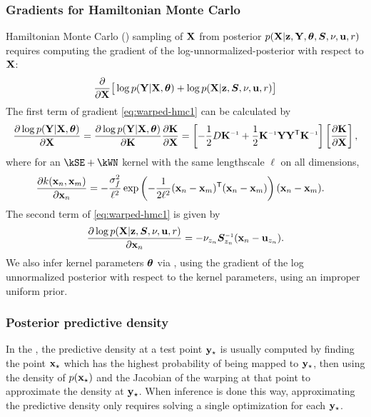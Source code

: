 \subsubsection{Gradients for Hamiltonian Monte Carlo}

Hamiltonian Monte Carlo (\HMC{}) sampling of $\mathbf{X}$ from posterior ${p(\mathbf{X}|{\bf{z}},\mathbf{Y},\bm{\theta},\bm{S},\nu,{\bf{u}},r)}$ requires computing the gradient of the log-unnormalized-posterior with respect to $\mathbf{X}$:
%
\begin{align}
\frac{\partial }{\partial \mathbf{X}} \big[ \log p(\mathbf{Y}|\mathbf{X},\bm{\theta}) + \log p(\mathbf{X}|{\bf{z}},\bm{S},\nu,{\bf{u}},r) \big]
\label{eq:warped-hmc1}
\end{align}
%
The first term of gradient \eqref{eq:warped-hmc1} can be calculated by
%
\begin{align}
\pderiv{\log p(\vY | \vX,\bm{\theta})}{\vX} =  \pderiv{\log p(\vY | \vX,\bm{\theta})}{\vK} \pderiv{\vK}{\vX} = \left[ -\frac{1}{2}D\vK\inv+\frac{1}{2}\vK\inv \vY \vY\tra \vK\inv \right]\left[\pderiv{\vK}{\vX}\right],
\label{eq:warped-hmc2}
\end{align}
%
where for an $\kSE + \kWN$ kernel with the same lengthscale $\ell$ on all dimensions,
%
\begin{align}
\frac{\partial k({\bf{x}}_{n},{\bf{x}}_{m})}{\partial {\bf{x}}_n}
 & = -\frac{\sigma^2_f}{\ell^2} \exp \left( - \frac{1}{2 \ell^2} ({\bf{x}}_n - {\bf{x}}_m)^{\mathsf{T}} ({\bf{x}}_n - {\bf{x}}_m) \right) ({\bf{x}}_n - {\bf{x}}_m).
 \label{eq:warped-hmc3}
\end{align}
%
The second term of \eqref{eq:warped-hmc1} is given by
\begin{align}
\frac{\partial \log p(\vX|\CLAS,\bm{S},\nu,\vu,r)}{\partial \vx_{n}} 
= -\nu_{z_{n}}\bm{S}_{z_{n}}\inv(\vx_{n}-\vu_{z_{n}}).
\label{eq:warped-hmc4}
\end{align}
We also infer kernel parameters ${\boldsymbol{\theta}}$ via \HMC{}, using the gradient of the log unnormalized posterior with respect to the kernel parameters, using an improper uniform prior.




\subsubsection{Posterior predictive density}
\label{sec:iwmm-predictive-density}

In the \gplvm{}, the predictive density at a test point ${\bf{y}}_\star$ is usually computed by finding the point ${\bf{x}}_\star$ which has the highest probability of being mapped to ${\bf{y}}_\star$, then using the density of $p({\bf{x}}_\star)$ and the Jacobian of the warping at that point to approximate the density at ${\bf{y}}_\star$.
When inference is done this way, approximating the predictive density only requires solving a single optimization for each ${\bf{y}}_\star$.  

